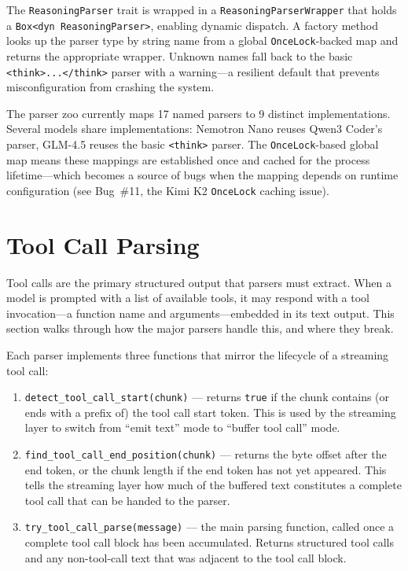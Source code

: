 The \texttt{Reasoning\-Parser} trait is wrapped in a \texttt{Reasoning\-Parser\-Wrapper} that holds a \texttt{Box<dyn Reasoning\-Parser>}, enabling dynamic dispatch. A factory method looks up the parser type by string name from a global \texttt{OnceLock}-backed map and returns the appropriate wrapper. Unknown names fall back to the basic \texttt{<think>...</think>} parser with a warning---a resilient default that prevents misconfiguration from crashing the system.

\begin{notebox}
The parser zoo currently maps 17 named parsers to 9 distinct implementations. Several models share implementations: Nemotron Nano reuses Qwen3 Coder's parser, GLM-4.5 reuses the basic \texttt{<think>} parser. The \texttt{OnceLock}-based global map means these mappings are established once and cached for the process lifetime---which becomes a source of bugs when the mapping depends on runtime configuration (see Bug~\#11, the Kimi K2 \texttt{OnceLock} caching issue).
\end{notebox}

\section{Tool Call Parsing}
\label{sec:codecs:toolcalls}

%
Tool calls are the primary structured output that parsers must extract. When a model is prompted with a list of available tools, it may respond with a tool invocation---a function name and arguments---embedded in its text output. This section walks through how the major parsers handle this, and where they break.

Each parser implements three functions that mirror the lifecycle of a streaming tool call:

\begin{enumerate}
  \item \texttt{detect\_tool\_call\_start(chunk)} --- returns \texttt{true} if the chunk contains (or ends with a prefix of) the tool call start token. This is used by the streaming layer to switch from ``emit text'' mode to ``buffer tool call'' mode.
  \item \texttt{find\_tool\_call\_end\_position(chunk)} --- returns the byte offset after the end token, or the chunk length if the end token has not yet appeared. This tells the streaming layer how much of the buffered text constitutes a complete tool call that can be handed to the parser.
  \item \texttt{try\_tool\_call\_parse(message)} --- the main parsing function, called once a complete tool call block has been accumulated. Returns structured tool calls and any non-tool-call text that was adjacent to the tool call block.
\end{enumerate}

